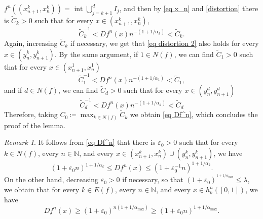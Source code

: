 \documentclass[12pt]{amsart}
\numberwithin{equation}{section} %
\numberwithin{figure}{section} %
\theoremstyle{plain}
\theoremstyle{definition}
\theoremstyle{remark}
\newtheorem{rema}[prop]{Remark}
\theoremstyle{citing}
\newcommand{\N}{\mathbb{N}}
\renewcommand{\=}{\coloneqq}
\begin{document}
    $f^n((x_{n+1}^k,x_n^k))=\text{ int }\bigcup_{j=k+1}^{d}I_{j}$, and then by \eqref{eq x_n} and \eqref{distortion} there is $\widetilde{C}_k>0$ such that for every $x\in (x_{n+1}^k,x_n^k)$, 
    \begin{equation}\label{eq distortion 2}
        \widetilde{C}_k^{-1}<Df^n(x)n^{-(1+1/\alpha_k)}<\widetilde{C}_k.
    \end{equation}
    Again, increasing $\widetilde{C}_k$ if necessary, we get that \eqref{eq distortion 2} also holds for every $x\in(y_n^k,y_{n+1}^k)$. By the same argument, if $1\in N(f)$, we can find $\widetilde{C}_1>0$ such that for every $x\in (x_{n+1}^1,x_n^1)$
    \begin{equation*}
        \widetilde{C}_1^{-1}<Df^n(x)n^{-(1+1/\alpha_1)}<\widetilde{C}_1,
    \end{equation*}
    and if $d\in N(f)$, we can find $\widetilde{C}_d>0$ such that for every $x\in(y_{n}^d,y_{n+1}^d)$
    \begin{equation*}
        \widetilde{C}_d^{-1}<Df^n(x)n^{-(1+1/\alpha_d)}<\widetilde{C}_d
    \end{equation*}
    Therefore, taking $C_0\=\max_{k\in N(f)} \widetilde{C}_k$ we obtain \eqref{eq Df^n}, which concludes the proof of the lemma.
\endproof

\begin{rema}\label{rmk MP bound 1}
    It follows from \eqref{eq Df^n} that there is $\varepsilon_0>0$ such that for every $k\in N(f)$, every $n\in\N$, and every $x\in (x^k_{n+1},x^k_n)\cup(y^k_n,y^k_{n+1})$, we have
    \begin{equation}\label{MP bound}
    (1+\varepsilon_0 n)^{1+1/\alpha_k} \leq Df^n(x) \leq (1+\varepsilon_0^{-1} n)^{1+1/\alpha_k}.
\end{equation}
On the other hand, decreasing $\varepsilon_0>0$ if necessary, so that $(1+\varepsilon_0)^{^{1+1/\alpha_{\max}}}\leq \lambda$, we obtain that for every $k\in E(f)$, every $n\in \N$, and every $x\in h_k^n([0,1])$, we have
\begin{equation}
    Df^n(x) \geq (1+\varepsilon_0)^{n(1+1/\alpha_{\max})} \geq (1+\varepsilon_0 n)^{1+1/\alpha_{\max}}.
\end{equation}
\end{rema}
\end{document}
